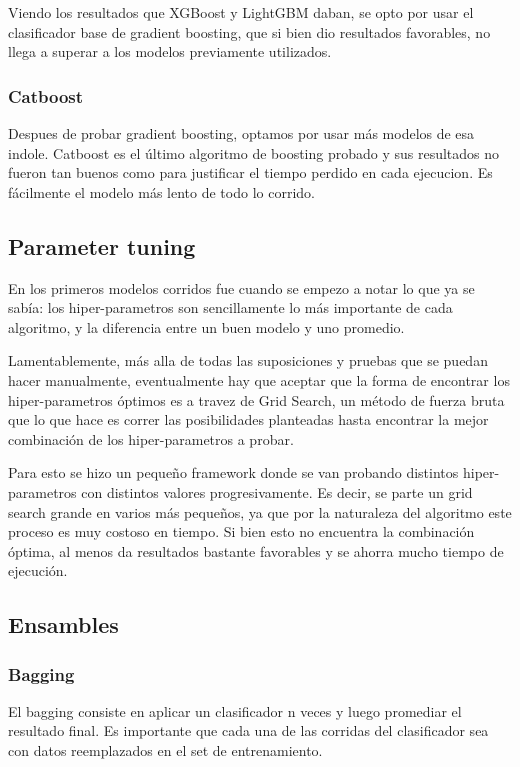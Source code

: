 \documentclass[a4paper]{article}
\begin{document}
Viendo los resultados que XGBoost y LightGBM daban, se opto por usar el clasificador base de gradient boosting, que si bien dio resultados favorables, no llega a superar a los modelos previamente utilizados.

\subsubsection{Catboost}

Despues de probar gradient boosting, optamos por usar más modelos de esa indole. Catboost es el último algoritmo de boosting probado y sus resultados no fueron tan buenos como para justificar el tiempo perdido en cada ejecucion. Es fácilmente el modelo más lento de todo lo corrido.

\subsection{Parameter tuning}

En los primeros modelos corridos fue cuando se empezo a notar lo que ya se sabía: los hiper-parametros son sencillamente lo más importante de cada algoritmo, y la diferencia entre un buen modelo y uno promedio.

Lamentablemente, más alla de todas las suposiciones y pruebas que se puedan hacer manualmente, eventualmente hay que aceptar que la forma de encontrar los hiper-parametros óptimos es a travez de Grid Search, un método de fuerza bruta que lo que hace es correr las posibilidades planteadas hasta encontrar la mejor combinación de los hiper-parametros a probar.

Para esto se hizo un pequeño framework donde se van probando distintos hiper-parametros con distintos valores progresivamente. Es decir, se parte un grid search grande en varios más pequeños, ya que por la naturaleza del algoritmo este proceso es muy costoso en tiempo. Si bien esto no encuentra la combinación óptima, al menos da resultados bastante favorables y se ahorra mucho tiempo de ejecución.

\subsection{Ensambles}

\subsubsection{Bagging}

El bagging consiste en aplicar un clasificador n veces y luego promediar el resultado final. Es importante que cada una de las corridas del clasificador sea con datos reemplazados en el set de entrenamiento.
\end{document}

